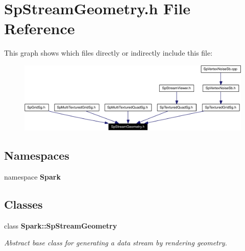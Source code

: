 \section{Sp\-Stream\-Geometry.h File Reference}
\label{SpStreamGeometry_8h}


This graph shows which files directly or indirectly include this file:\begin{figure}[H]
\begin{center}
\leavevmode
\includegraphics[width=331pt]{SpStreamGeometry_8h__dep__incl}
\end{center}
\end{figure}
\subsection*{Namespaces}
\begin{CompactItemize}
\item 
namespace {\bf Spark}
\end{CompactItemize}
\subsection*{Classes}
\begin{CompactItemize}
\item 
class {\bf Spark::Sp\-Stream\-Geometry}
\begin{CompactList}\small\item\em Abstract base class for generating a data stream by rendering geometry. \item\end{CompactList}\end{CompactItemize}
